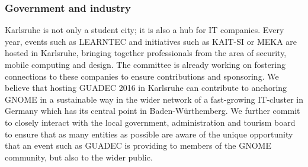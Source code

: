 \subsubsection{ Government and industry}

Karlsruhe is not only a student city; it is also a hub for IT companies. Every year, events such as LEARNTEC and initiatives such as KAIT-SI or MEKA are hosted in Karlsruhe, bringing together professionals from the area of security, mobile computing and design. The committee is already working on fostering connections to these companies to ensure contributions and sponsoring. We believe that hosting GUADEC 2016 in Karlsruhe can contribute to anchoring GNOME in a sustainable way in the wider network of a fast-growing IT-cluster in Germany which has its central point in Baden-Würthemberg. We further commit to closely interact with the local government, administration and tourism board to ensure that as many entities as possible are aware of the unique opportunity that an event such as GUADEC is providing to members of the GNOME community, but also to the wider public.  
